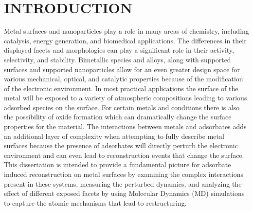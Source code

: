%

\chapter{INTRODUCTION}
Metal surfaces and nanoparticles play a role in many areas of chemistry,
including catalysis\citep{}, energy generation\citep{}, and biomedical
applications.\citep{Padmos:0qf} The differences in their displayed facets and
morphologies can play a significant role in their activity\citep{},
selectivity\citep{}, and stability\citep{Zhang:2015ys, Zhang:2007uq}. Bimetallic species and
alloys\citep{}, along with supported surfaces and supported
nanoparticles\citep{} allow for an even greater design space for various
mechanical\citep{Cao:2010gf, Huang:2012ul}, optical\citep{}, and catalytic properties\citep{Han:0qr} because
of the modification of the electronic environment.  In most practical
applications the surface of the metal will be exposed to a variety of
atmospheric compositions leading to various adsorbed species on the surface.
For certain metals and conditions there is also the possibility of oxide
formation which can dramatically change the surface properties for the
material.\citep{Derouin:2015kx} The interactions between metals and adsorbates adds an additional 
layer of complexity when attempting to fully describe metal surfaces because
the presence of adsorbates will directly perturb the electronic environment and
can even lead to reconstruction events that change the surface.\citep{Tao:2010aa, Tao:2008aa, Kim:2013mi} This
dissertation is intended to provide a fundamental picture for adsorbate induced
reconstruction on metal surfaces by examining the complex interactions present
in these systems, measuring the perturbed dynamics, and analyzing the effect of
different exposed facets by using Molecular Dynamics (MD) simulations to
capture the atomic mechanisms that lead to restructuring.


